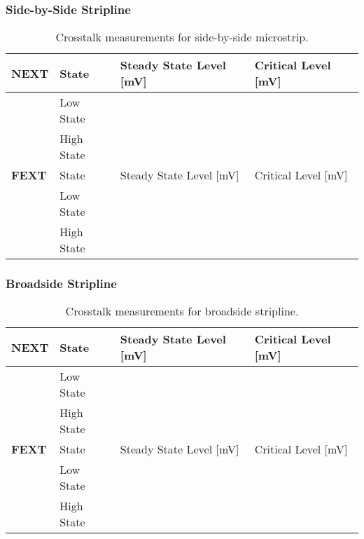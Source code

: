 \documentclass[../main.tex]{subfiles}
\begin{document}
\subsubsection{Side-by-Side Stripline}

\begin{table}[h]
    \centering
    \begin{tabular}{l l|l l}
        \toprule[1pt]
        \textbf{NEXT} & State & Steady State Level [mV] & Critical Level [mV] \\
        \midrule
        & Low State & & \\
        & High State & & \\
        \midrule[1pt]
        \textbf{FEXT} & State & Steady State Level [mV] & Critical Level [mV] \\
        \midrule
        & Low State & & \\
        & High State & & \\
        \bottomrule[1pt]
    \end{tabular}
    \caption{Crosstalk measurements for side-by-side microstrip.}
    \label{tab:calc-side-by-side-stripline}
\end{table}

\subsubsection{Broadside Stripline}

\begin{table}[h]
    \centering
    \begin{tabular}{l l|l l}
        \toprule[1pt]
        \textbf{NEXT} & State & Steady State Level [mV] & Critical Level [mV] \\
        \midrule
        & Low State & & \\
        & High State & & \\
        \midrule[1pt]
        \textbf{FEXT} & State & Steady State Level [mV] & Critical Level [mV] \\
        \midrule
        & Low State & & \\
        & High State & & \\
        \bottomrule[1pt]
    \end{tabular}
    \caption{Crosstalk measurements for broadside stripline.}
    \label{tab:calc-broadside-stripline}
\end{table}
\end{document}
